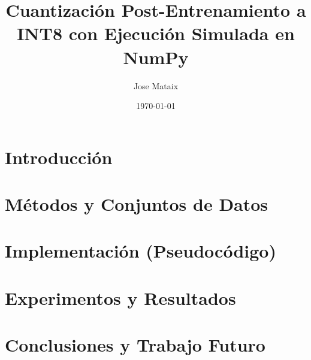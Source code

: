 \documentclass[11pt,a4paper]{article}
\title{Cuantización Post-Entrenamiento a INT8 con Ejecución Simulada en NumPy}
\author{Jose Mataix}
\date{\today}
\begin{document}
\maketitle

\begin{abstract}

\end{abstract}

\tableofcontents
\listoffigures
\listoftables

\section{Introducción}


\section{Métodos y Conjuntos de Datos}


\section{Implementación (Pseudocódigo)}


\section{Experimentos y Resultados}


\section{Conclusiones y Trabajo Futuro}




\end{document}
